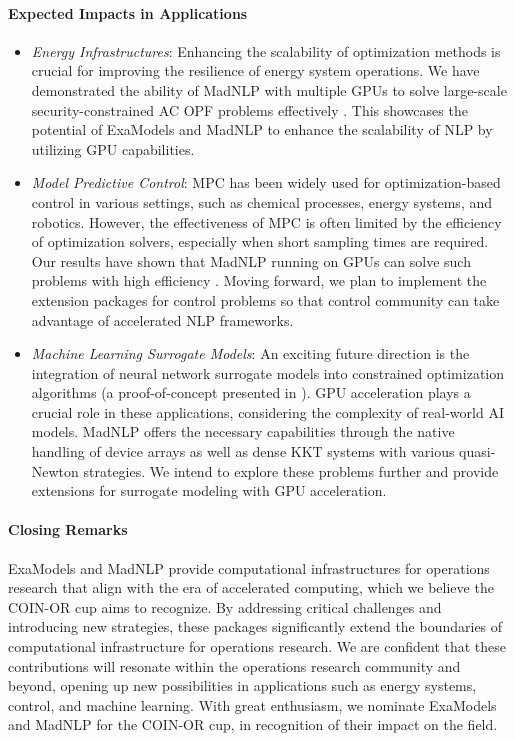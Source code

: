 \paragraph{Expected Impacts in Applications}

\begin{itemize}
\item \textit{Energy Infrastructures}: Enhancing the scalability of
optimization methods is crucial for improving the resilience of energy
system operations. We have demonstrated the ability of MadNLP with
multiple GPUs to solve large-scale security-constrained AC OPF
problems effectively \cite{pacaud2023parallel}. This showcases the
potential of ExaModels and MadNLP to enhance the scalability of NLP by
utilizing GPU capabilities.

\item \textit{Model Predictive Control}: MPC has been widely used for
optimization-based control in various settings, such as chemical
processes, energy systems, and robotics. However, the effectiveness of
MPC is often limited by the efficiency of optimization solvers,
especially when short sampling times are required. Our results have
shown that MadNLP running on GPUs can solve such problems with high
efficiency \cite{cole2023exploiting}. Moving forward, we plan to
implement the extension packages for control problems so that control
community can take advantage of accelerated NLP frameworks.

\item \textit{Machine Learning Surrogate Models}: An exciting future
direction is the integration of neural network surrogate models into
constrained optimization algorithms (a proof-of-concept presented in
\cite{shin2023constrained}). GPU acceleration plays a crucial role in
these applications, considering the complexity of real-world AI
models. MadNLP offers the necessary capabilities through the native
handling of device arrays as well as dense KKT systems with various
quasi-Newton strategies. We intend to explore these problems further
and provide extensions for surrogate modeling with GPU acceleration.

\end{itemize}

\paragraph{Closing Remarks} ExaModels and MadNLP provide computational
infrastructures for operations research that align with the era of
accelerated computing, which we believe the COIN-OR cup aims to
recognize. By addressing critical challenges and introducing new
strategies, these packages significantly extend the boundaries of
computational infrastructure for operations research. We are confident
that these contributions will resonate within the operations research
community and beyond, opening up new possibilities in applications
such as energy systems, control, and machine learning. With great
enthusiasm, we nominate ExaModels and MadNLP for the COIN-OR cup, in
recognition of their impact on the field.

 

